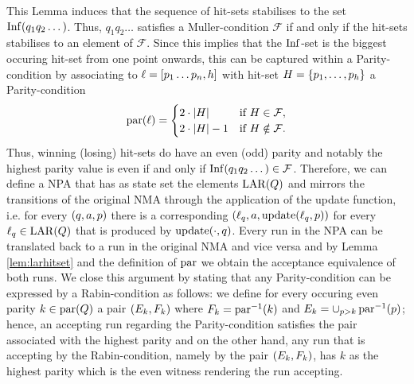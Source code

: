 This Lemma induces that the sequence of hit-sets stabilises to the set
$\operatorname{Inf}(q_{1}q_{2}\dots)$. Thus, $q_{1}q_{2}\dots$ satisfies a Muller-condition
$\mathcal{F}$ if and only if the hit-sets stabilises to an element of
$\mathcal{F}$. Since this implies that the $\operatorname{Inf}$-set is the biggest occuring 
hit-set from one point onwards, this can be captured within a Parity-condition
by associating to $\ell = \left[p_{1}\dots p_{n},h\right]$ with hit-set 
$H = \left\{p_{1},\dots,p_{h}\right\}$ a Parity-condition
\begin{equation*}
  \operatorname{par}(\ell) = \begin{cases}
    2\cdot\left\vert{H}\right\vert &\text{if }H\in\mathcal{F},\\
    2\cdot\left\vert{H}\right\vert-1 &\text{if }H\notin\mathcal{F}.
  \end{cases}
\end{equation*}
Thus, winning (losing) hit-sets do have an even (odd) parity and notably the
highest parity value is even if and only if
$\operatorname{Inf}(q_{1}q_{2}\dots)\in\mathcal{F}$. Therefore, we can define a \ac{NPA}
that has as state set the elements $\operatorname{LAR}(Q)$ and mirrors the transitions of
the original \ac{NMA} through the application of the update function, i.e.
for every $\left(q, a, p\right)$ there is a corresponding
$\left(\ell_{q}, a, \operatorname{update}(\ell_{q}, p)\right)$ for every $\ell_{q}\in\operatorname{LAR}(Q)$ that
is produced by $\operatorname{update}(\cdot,q)$. Every run in the \ac{NPA} can be translated
back to a run in the original \ac{NMA} and vice versa and by Lemma
\ref{lem:larhitset} and the definition of $\operatorname{par}$ we obtain the acceptance
equivalence of both runs. We close this argument by stating that
any Parity-condition can be expressed by a Rabin-condition as follows:
we define for every occuring even parity $k\in\operatorname{par}(Q)$ a pair
$\left(E_{k}, F_{k}\right)$ where $F_{k} = \operatorname{par}^{-1}(k)$ and
$E_{k} = \cup_{p>k}\operatorname{par}^{-1}(p)$; hence, an accepting run regarding the
Parity-condition satisfies the pair associated with the highest parity and
on the other hand, any run that is accepting by the Rabin-condition, namely
by the pair $\left(E_{k}, F_{k}\right)$, has  $k$ as the highest parity which is
the even witness rendering the run accepting.

